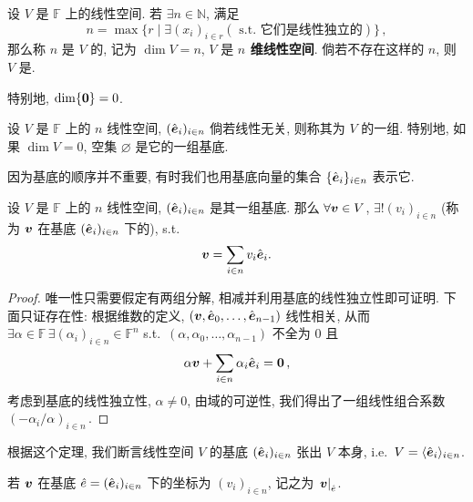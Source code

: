 \documentclass[openany, a5paper, oneside]{ctexbook}
\newcommand*{\inbasis}[2]{\left.%
	{#1}\right|_{#2}
}
\begin{document}
\begin{definition}[维数]
	设 $V$ 是 $\mathbb F$ 上的线性空间. 若 $\exists n \in \mathbb N$, 满足
	\begin{equation*}
		n = \max \{r \mid \exists (x_i)_{i \in r} (\text{\ s.t.\ 它们是线性独立的}) \}\,,
	\end{equation*}
	那么称 $n$ 是 $V$ 的, 记为 $\dim V = n$, $V$ 是 \textbf{$n$ 维线性空间}. 倘若不存在这样的 $n$, 则 $V$ 是. 
\end{definition}

特别地, $\dim \{\boldsymbol{0}\} = 0$.

\begin{definition}[基底]
	设 $V$ 是 $\mathbb F$ 上的 $n$ 线性空间, $(\hat{\boldsymbol{e}}_i)_{i \in n}$ 倘若线性无关, 则称其为 $V$ 的一组. 特别地, 如果 $\dim V = 0$, 空集 $\varnothing$ 是它的一组基底.
\end{definition}

因为基底的顺序并不重要, 有时我们也用基底向量的集合 $\{\hat{\boldsymbol{e}}_i\}_{i \in n}$ 表示它.

\begin{theorem}[唯一分解]\label{theorem: 唯一分解}
	设 $V$ 是 $\mathbb F$ 上的 $n$ 线性空间, $(\hat{\boldsymbol{e}}_i)_{i \in n}$ 是其一组基底.
	那么 $\forall \boldsymbol{v} \in V$, $\exists ! (v_i)_{i \in n}$ (称为 $\boldsymbol{v}$ 在基底 $(\hat{\boldsymbol{e}}_i)_{i \in n}$ 下的), s.t.\ 
	\begin{equation*}
		\boldsymbol{v} = \sum_{i \in n} v_i \hat{\boldsymbol{e}}_i.
	\end{equation*}
\end{theorem}
\begin{proof}
	唯一性只需要假定有两组分解, 相减并利用基底的线性独立性即可证明. 
	下面只证存在性:
	根据维数的定义, $(\boldsymbol{v}, \hat{\boldsymbol{e}}_0, \ldots, \hat{\boldsymbol{e}}_{n - 1})$ 线性相关, 从而
	$\exists \alpha \in \mathbb F\, \exists (\alpha_i)_{i \in n} \in \mathbb F^n$ s.t.\ $(\alpha, \alpha_0, \ldots, \alpha_{n - 1})$ 不全为 $0$ 且
	\begin{equation*}
		\alpha \boldsymbol{v} + \sum_{i \in n} \alpha_i \hat{\boldsymbol{e}}_i = \boldsymbol{0}\,,
	\end{equation*}
	考虑到基底的线性独立性, $\alpha \neq 0$, 由域的可逆性, 我们得出了一组线性组合系数 $( - \alpha_i / \alpha)_{i \in n}$\,.
\end{proof}

根据这个定理, 我们断言线性空间 $V$ 的基底 $(\hat{\boldsymbol{e}}_i)_{i \in n}$ 张出 $V$ 本身, 
i.e.\ $V = \langle\hat{\boldsymbol{e}}_i\rangle_{i \in n}$. 

若 $\boldsymbol{v}$ 在基底 $\hat e = (\hat{\boldsymbol{e}}_i)_{i \in n}$ 下的坐标为 $(v_i)_{i \in n}$, 记之为 $\inbasis{\bv v}{\hat e}$. 
\end{document}
